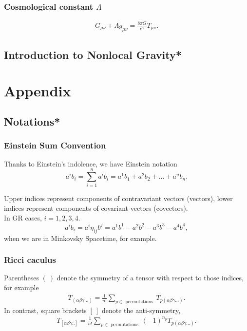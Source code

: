 \documentclass[openany,10pt]{book}
\theoremstyle{definition}
\theoremstyle{definition}
\theoremstyle{remark}
\newcommand{\be}{\begin{eqnarray}}
\newcommand{\ee}{\end{eqnarray}}
\begin{document}
\section[Cosmological constant]{Cosmological constant $\Lambda$}

\be
\boxed{G_{\mu\nu}+\Lambda g_{\mu\nu}=\frac{8\pi G}{c^4}T_{\mu\nu}.}
\ee







\chapter{Introduction to Nonlocal Gravity*}







\part{Appendix}
\chapter{Notations*}
\section{Einstein Sum Convention}
Thanks to Einstein's indolence, we have Einstein notation
\begin{equation}
    a^ib_i=\sum^n_{i=1}a^ib_i=a^1b_1+a^2b_2+...+a^nb_n.
\end{equation}

Upper indices represent components of contravariant vectors (vectors), lower indices represent components of covariant vectors (covectors).\\

In GR cases, $i=1,2,3,4$. 
\begin{equation}
    a^ib_i=a^i\eta_{ij}b^j=a^1b^1-a^2b^2-a^3b^3-a^4b^4,
\end{equation}
when we are in Minkovsky Spacetime, for example.

\section{Ricci caculus}\label{riccaculus}
Parentheses $(\ )$ denote the symmetry of a tensor with respect to those indices, for example
\be
T_{(\alpha \beta \gamma \ldots)}=\frac{1}{n !} \sum_{p \in \text { permutations }} T_{p(\alpha \beta \gamma \dots)}.
\ee
In contrast, square brackets $[\ ]$ denote the anti-symmetry, 
\be
T_{[\alpha \beta \gamma . .]}=\frac{1}{n !} \sum_{p \in \text { permutations }}(-1)^{n_{p}} T_{p(\alpha \beta \gamma \dots)}.
\ee
\end{document}
